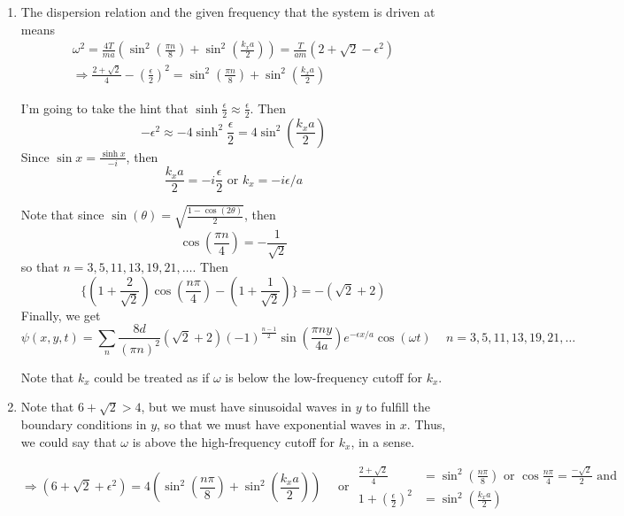 \documentclass[twoside,10pt]{amsart}
\begin{document}
\begin{enumerate}
\item The dispersion relation and the given frequency that the system is driven at means
\[
\begin{gathered}
  \omega^2 = \frac{4T}{ma} ( \sin^2{ (\frac{ \pi n }{8} ) } + \sin^2{ ( \frac{ k_x a}{2} )} ) = \frac{T}{am} ( 2 + \sqrt{2} - \epsilon^2) \\
  \Longrightarrow \frac{ 2 + \sqrt{2} }{ 4} - \left( \frac{ \epsilon}{2} \right)^2  = \sin^2{ \left( \frac{ \pi n }{8} \right) } + \sin^2{ \left( \frac{ k_x a}{2} \right) }
\end{gathered}
\]

I'm going to take the hint that $\sinh{ \frac{ \epsilon}{2} } \approx \frac{ \epsilon}{2}$.  Then 
\[
-\epsilon^2 \approx -4 \sinh^2{ \frac{\epsilon}{2} } = 4 \sin^2{ \left( \frac{ k_x a}{2} \right) }
\]
Since $\sin{x} = \frac{ \sinh{x}}{-i}$, then 
\[
\frac{ k_x a}{2} = -i \frac{\epsilon}{ 2} \text{ or } k_x = -i \epsilon/a
\]

Note that since $\sin(\theta) = \sqrt{ \frac{ 1 - \cos{(2\theta)}}{2} }$, then 
\[
\cos{\left( \frac{ \pi n}{4} \right)} = - \frac{1}{ \sqrt{2}}
\]
so that $n = 3,5,11,13,19,21, \dots$.  Then 
\[
\{ (1 + \frac{2}{\sqrt{2}} ) \cos{ \left( \frac{ n\pi}{4} \right) } - (1 + \frac{1}{ \sqrt{2}} ) \} = - (\sqrt{2} + 2 ) 
\]
Finally, we get
\[
\boxed{ \psi(x,y,t) = \sum_n \frac{8d}{ (\pi n)^2} ( \sqrt{2} + 2) (-1)^{ \frac{ n-1}{2} } \sin{ \left( \frac{ \pi n y}{4a} \right) } e^{-\epsilon x/a} \cos{ (\omega t) } } \quad \, n = 3,5,11,13,19,21,\dots
\]

Note that $k_x$ could be treated as if $\omega$ is below the low-frequency cutoff for $k_x$.  
\item Note that $6  + \sqrt{2} > 4$, but we must have sinusoidal waves in $y$ to fulfill the boundary conditions in $y$, so that we must have exponential waves in $x$.  Thus, we could say that $\omega$ is above the high-frequency cutoff for $k_x$, in a sense.  

\[
\Longrightarrow ( 6 + \sqrt{2} + \epsilon^2 ) = 4 ( \sin^2{ \left( \frac{n \pi }{8} \right) } +\sin^2{ \left( \frac{k_x a}{2} \right) } ) \quad \text{ or } \begin{aligned} \frac{ 2 + \sqrt{2} }{4} & = \sin^2{ \left( \frac{ n \pi }{8} \right) } \text{ or } \cos{ \frac{ n \pi }{4} } = \frac{ -\sqrt{2} }{2} \text{ and }  \\ 1 + \left( \frac{ \epsilon }{2} \right)^2 &  = \sin^2{ \left( \frac{k_x a}{2} \right) } \end{aligned}
\]


\end{enumerate}
\end{document}
